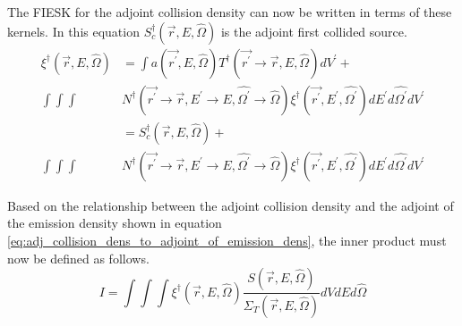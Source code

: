 The FIESK for the adjoint collision density can now be written in terms of 
these kernels. In this equation $S_c^{\dagger}(\vec{r},E,\hat{\Omega})$ is the
adjoint first collided source.
\begin{align}
  \xi^{\dagger}(\vec{r},E,\hat{\Omega}) & = \int a(\vec{r^{'}},E,\hat{\Omega}) 
  T^{\dagger}(\vec{r^{'}} \to \vec{r},E,\hat{\Omega}) dV^{'} + \nonumber \\
  \int\int\int &
  N^{\dagger}(\vec{r^{'}} \to \vec{r},E^{'} \to E,\hat{\Omega^{'}} \to \hat{\Omega})
  \xi^{\dagger}(\vec{r^{'}},E^{'},\hat{\Omega^{'}}) dE^{'}d\hat{\Omega^{'}}dV^{'}
  \nonumber \\
  & = S_c^{\dagger}(\vec{r},E,\hat{\Omega}) + \nonumber \\
  \int\int\int &
  N^{\dagger}(\vec{r^{'}} \to \vec{r},E^{'} \to E,\hat{\Omega^{'}} \to \hat{\Omega})
      \xi^{\dagger}(\vec{r^{'}},E^{'},\hat{\Omega^{'}}) dE^{'}d\hat{\Omega^{'}}dV^{'}
  \nonumber
\end{align}

Based on the relationship between the adjoint collision density and the adjoint
of the emission density shown in equation 
\ref{eq:adj_collision_dens_to_adjoint_of_emission_dens}, the inner product must
now be defined as follows.
\begin{equation}
  I = \int\int\int \xi^{\dagger}(\vec{r},E,\hat{\Omega})
  \frac{S(\vec{r},E,\hat{\Omega})}{\Sigma_T(\vec{r},E,\hat{\Omega})}
  dV dE d\hat{\Omega}
\end{equation}
 
